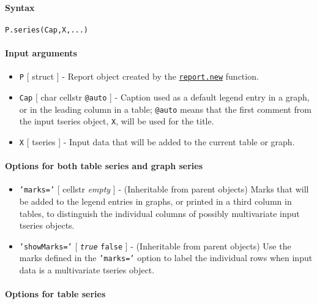 


	\paragraph{Syntax}

\begin{verbatim}
P.series(Cap,X,...)
\end{verbatim}

\paragraph{Input arguments}

\begin{itemize}
\item
  \texttt{P} {[} struct {]} - Report object created by the
  \href{report/new}{\texttt{report.new}} function.
\item
  \texttt{Cap} {[} char \textbar{} cellstr \textbar{} \texttt{@auto} {]}
  - Caption used as a default legend entry in a graph, or in the leading
  column in a table; \texttt{@auto} means that the first comment from
  the input tseries object, \texttt{X}, will be used for the title.
\item
  \texttt{X} {[} tseries {]} - Input data that will be added to the
  current table or graph.
\end{itemize}

\paragraph{Options for both table series and graph
series}

\begin{itemize}
\item
  \texttt{'marks='} {[} cellstr \textbar{} \emph{empty} {]} -
  (Inheritable from parent objects) Marks that will be added to the
  legend entries in graphs, or printed in a third column in tables, to
  distinguish the individual columns of possibly multivariate input
  tseries objects.
\item
  \texttt{'showMarks='} {[} \emph{\texttt{true}} \textbar{}
  \texttt{false} {]} - (Inheritable from parent objects) Use the marks
  defined in the \texttt{'marks='} option to label the individual rows
  when input data is a multivariate tseries object.
\end{itemize}

\paragraph{Options for table series}

